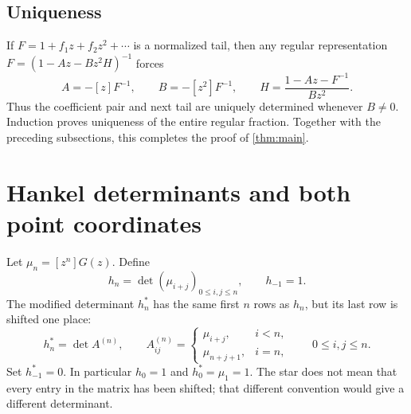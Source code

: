 \documentclass[11pt,letterpaper]{article}
\numberwithin{equation}{section}
\theoremstyle{definition}
\theoremstyle{remark}
\begin{document}
\subsection{Uniqueness}
If $F=1+f_1z+f_2z^2+\cdots$ is a normalized tail, then any regular
representation $F=(1-Az-Bz^2H)^{-1}$ forces
\[
 A=-[z]F^{-1},\qquad B=-[z^2]F^{-1},\qquad
 H=\frac{1-Az-F^{-1}}{Bz^2}.
\]
Thus the coefficient pair and next tail are uniquely determined whenever
$B\ne0$. Induction proves uniqueness of the entire regular fraction.
Together with the preceding subsections, this completes the proof of
\cref{thm:main}.

\section{Hankel determinants and both point coordinates}\label{sec:hankel}

Let $\mu_n=[z^n]G(z)$. Define
\begin{equation}\label{eq:h}
 h_n=\det(\mu_{i+j})_{0\le i,j\le n},\qquad h_{-1}=1.
\end{equation}
The modified determinant $h_n^*$ has the same first $n$ rows as $h_n$,
but its last row is shifted one place:
\begin{equation}\label{eq:hstar}
 h_n^*=\det A^{(n)},\qquad
 A^{(n)}_{ij}=\begin{cases}
 \mu_{i+j},&i<n,\\
 \mu_{n+j+1},&i=n,
 \end{cases}\qquad 0\le i,j\le n.
\end{equation}
Set $h_{-1}^*=0$. In particular $h_0=1$ and $h_0^*=\mu_1=1$.
The star does not mean that every entry in the matrix has been shifted;
that different convention would give a different determinant.
\end{document}
